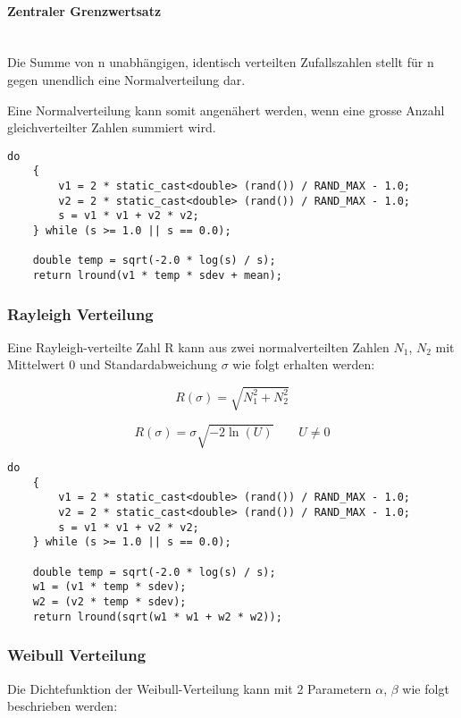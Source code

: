 \paragraph{Zentraler Grenzwertsatz}~\\
Die Summe von n unabhängigen, identisch verteilten Zufallszahlen stellt für n gegen unendlich eine Normalverteilung dar.

Eine Normalverteilung kann somit angenähert werden, wenn eine grosse Anzahl gleichverteilter Zahlen summiert wird.

\begin{lstlisting}[style=C]
	do
	{
		v1 = 2 * static_cast<double> (rand()) / RAND_MAX - 1.0;
		v2 = 2 * static_cast<double> (rand()) / RAND_MAX - 1.0;
		s = v1 * v1 + v2 * v2;
	} while (s >= 1.0 || s == 0.0);
	
	double temp = sqrt(-2.0 * log(s) / s);
	return lround(v1 * temp * sdev + mean);
\end{lstlisting} 

\subsubsection{Rayleigh Verteilung}
Eine Rayleigh-verteilte Zahl R kann aus zwei normalverteilten Zahlen $N_1$, $N_2$ mit Mittelwert 0 und Standardabweichung $\sigma$ wie folgt erhalten werden:

\begin{equation}
	R(\sigma) = \sqrt{N_1^2 + N_2^2}
\end{equation}

 \begin{equation}
 	R(\sigma) = \sigma \sqrt{-2 \ln(U)} \qquad U \neq 0
 \end{equation}

\begin{lstlisting}[style=C]
	do
	{
		v1 = 2 * static_cast<double> (rand()) / RAND_MAX - 1.0;
		v2 = 2 * static_cast<double> (rand()) / RAND_MAX - 1.0;
		s = v1 * v1 + v2 * v2;
	} while (s >= 1.0 || s == 0.0);
	
	double temp = sqrt(-2.0 * log(s) / s);
	w1 = (v1 * temp * sdev);
	w2 = (v2 * temp * sdev);
	return lround(sqrt(w1 * w1 + w2 * w2));

\end{lstlisting} 

\subsubsection{Weibull Verteilung}
Die Dichtefunktion der Weibull-Verteilung kann mit 2 Parametern $\alpha$, $\beta$ wie folgt beschrieben werden:

